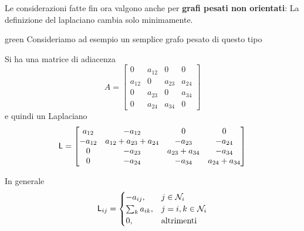 Le considerazioni fatte fin ora valgono anche per \textbf{grafi pesati non orientati}: La definizione del laplaciano cambia solo minimamente.
\begin{mybox}[breakable]{green}{}
Consideriamo ad esempio un semplice grafo pesato di questo tipo
\begin{center}
\end{center}
Si ha una matrice di adiacenza
\begin{equation*}
A = \begin{bmatrix}
0 & a_{12} & 0 & 0 \\
a_{12} & 0 & a_{23} & a_{24} \\
0 & a_{23} & 0 & a_{34} \\
0 & a_{24} & a_{34} & 0
\end{bmatrix}
\end{equation*}
e quindi un Laplaciano
\begin{equation*}
\mathsf{L} = \begin{bmatrix}
a_{12} & -a_{12} & 0 & 0 \\
-a_{12} & a_{12} + a_{23} + a_{24} & -a_{23} & -a_{24} \\
0 & -a_{23} & a_{23} + a_{34} & -a_{34} \\
0 & -a_{24} & -a_{34} & a_{24} + a_{34}
\end{bmatrix}
\end{equation*}
\end{mybox}
In generale
\begin{equation}
\mathsf{L}_{ij} = \begin{cases}
-a_{ij}, & j \in \mathcal{N}_i \\
\sum_{k}a_{ik}, & j=i, k \in \mathcal{N}_i \\
0, & \text{altrimenti}
\end{cases}
\end{equation}

